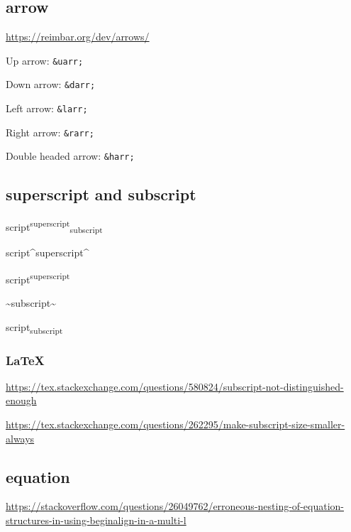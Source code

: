 \documentclass[
]{book}
\newenvironment{Shaded}{\begin{snugshade}}{\end{snugshade}}
\newcommand{\NormalTok}[1]{#1}
\theoremstyle{definition}
\theoremstyle{definition}
\theoremstyle{definition}
\theoremstyle{definition}
\theoremstyle{remark}
\begin{document}
\subsection{arrow}\label{arrow}

\url{https://reimbar.org/dev/arrows/}

Up arrow: \texttt{\&uarr;}

Down arrow: \texttt{\&darr;}

Left arrow: \texttt{\&larr;}

Right arrow: \texttt{\&rarr;}

Double headed arrow: \texttt{\&harr;}

\subsection{superscript and subscript}\label{superscript-and-subscript}

script\textsuperscript{superscript}\textsubscript{subscript}

\begin{Shaded}
\begin{Highlighting}[]
\NormalTok{script\^{}superscript\^{}}
\end{Highlighting}
\end{Shaded}

script\textsuperscript{superscript}

\begin{Shaded}
\begin{Highlighting}[]
\NormalTok{\textasciitilde{}subscript\textasciitilde{}}
\end{Highlighting}
\end{Shaded}

script\textsubscript{subscript}

\subsubsection{LaTeX}\label{latex}

\url{https://tex.stackexchange.com/questions/580824/subscript-not-distinguished-enough}

\url{https://tex.stackexchange.com/questions/262295/make-subscript-size-smaller-always}

\subsection{equation}\label{equation}

\url{https://stackoverflow.com/questions/26049762/erroneous-nesting-of-equation-structures-in-using-beginalign-in-a-multi-l}
\end{document}
